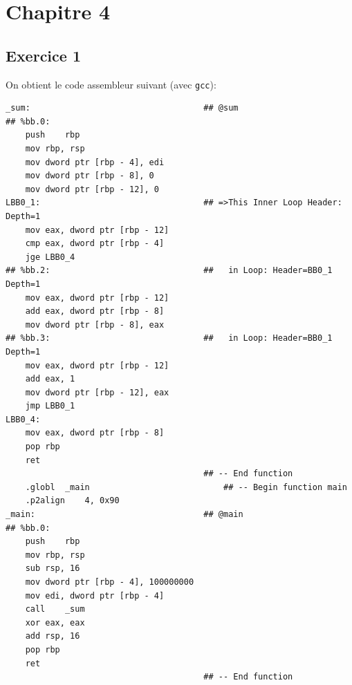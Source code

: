\documentclass[11pt, a4 paper]{article}
\begin{document}
\begin{figure}[!h]
\end{figure}
\pagebreak

\section{Chapitre 4}
\subsection{Exercice 1}
On obtient le code assembleur suivant (avec \texttt{gcc}):
\begin{lstlisting}[style=customasm]
_sum:                                   ## @sum
## %bb.0:
	push	rbp
	mov	rbp, rsp
	mov	dword ptr [rbp - 4], edi
	mov	dword ptr [rbp - 8], 0
	mov	dword ptr [rbp - 12], 0
LBB0_1:                                 ## =>This Inner Loop Header: Depth=1
	mov	eax, dword ptr [rbp - 12]
	cmp	eax, dword ptr [rbp - 4]
	jge	LBB0_4
## %bb.2:                               ##   in Loop: Header=BB0_1 Depth=1
	mov	eax, dword ptr [rbp - 12]
	add	eax, dword ptr [rbp - 8]
	mov	dword ptr [rbp - 8], eax
## %bb.3:                               ##   in Loop: Header=BB0_1 Depth=1
	mov	eax, dword ptr [rbp - 12]
	add	eax, 1
	mov	dword ptr [rbp - 12], eax
	jmp	LBB0_1
LBB0_4:
	mov	eax, dword ptr [rbp - 8]
	pop	rbp
	ret
                                        ## -- End function
	.globl	_main                           ## -- Begin function main
	.p2align	4, 0x90
_main:                                  ## @main
## %bb.0:
	push	rbp
	mov	rbp, rsp
	sub	rsp, 16
	mov	dword ptr [rbp - 4], 100000000
	mov	edi, dword ptr [rbp - 4]
	call	_sum
	xor	eax, eax
	add	rsp, 16
	pop	rbp
	ret
                                        ## -- End function
\end{lstlisting}
\end{document}
